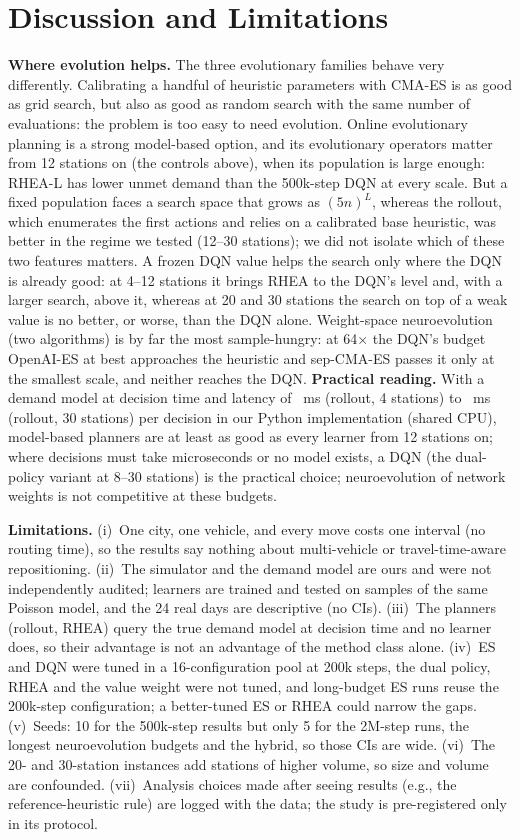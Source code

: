 \documentclass[conference,a4paper]{IEEEtran}
\begin{document}
\section{Discussion and Limitations}
\textbf{Where evolution helps.} The three evolutionary families behave very differently. Calibrating a handful of heuristic parameters with CMA-ES is as good as grid
search, but also as good as random search with the same number of evaluations: the problem is too easy to need evolution. Online evolutionary planning is a strong model-based option, and its evolutionary operators matter from 12 stations on (the controls above), when its population is large enough:
RHEA-L has lower unmet demand than the 500k-step DQN at every scale. But a fixed population faces a search space that grows as $(5n)^L$, whereas the rollout, which
enumerates the first actions and relies on a calibrated base heuristic, was better in the regime we tested (12--30 stations); we did not isolate which of these two
features matters. A frozen DQN value helps the search only where the DQN is already good: at 4--12 stations it brings RHEA to the DQN's level and, with a larger search, above it,
whereas at 20 and 30 stations the search on top of a weak value is no better, or worse, than the DQN alone. Weight-space neuroevolution (two algorithms) is by far the
most sample-hungry: at 64$\times$ the DQN's budget OpenAI-ES at best approaches the heuristic and sep-CMA-ES passes it only at the smallest scale, and neither reaches the DQN.
\textbf{Practical reading.} With a demand model at decision time and latency of \cecMsRollA\ ms (rollout, 4 stations) to \cecMsRollE\ ms (rollout, 30 stations)
per decision in our Python implementation (shared CPU), model-based planners are at least as good as every learner from 12 stations on; where decisions must take microseconds or no model exists, a
DQN (the dual-policy variant at 8--30 stations) is the practical choice; neuroevolution of network weights is not competitive at these budgets.

\textbf{Limitations.} (i)~One city, one vehicle, and every move costs one interval (no routing time), so the results say nothing about multi-vehicle or
travel-time-aware repositioning. (ii)~The simulator and the demand model are ours and were not independently audited; learners are trained and tested on samples of the
same Poisson model, and the 24 real days are descriptive (no CIs). (iii)~The planners (rollout, RHEA) query the true demand model at decision time and no learner does,
so their advantage is not an advantage of the method class alone. (iv)~ES and DQN were tuned in a 16-configuration pool at 200k steps, the dual policy, RHEA and the value weight were not
tuned, and long-budget ES runs reuse the 200k-step configuration; a better-tuned ES or RHEA could narrow the gaps. (v)~Seeds: 10 for the 500k-step results but only 5 for the
2M-step runs, the longest neuroevolution budgets and the hybrid, so those CIs are wide. (vi)~The 20- and 30-station instances add stations of higher volume, so size and volume are confounded. (vii)~Analysis
choices made after seeing results (e.g., the reference-heuristic rule) are logged with the data; the study is pre-registered only in its protocol.
\end{document}
